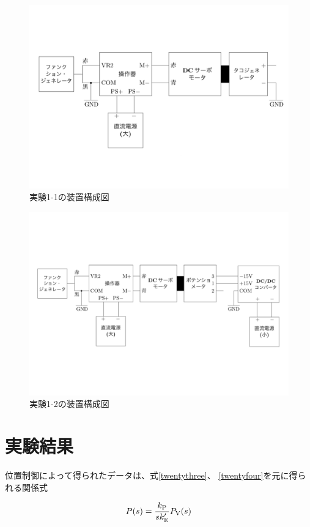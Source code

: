 \documentclass[uplatex, 11pt,a4j, titlepage]{jsarticle}
\begin{document}
\begin{figure}[h]
    \centering
    \includegraphics[width=12cm]{fig1.pdf}
    \caption{実験1-1の装置構成図}
    \label{fig1}
\end{figure}

\begin{figure}[h]
    \centering
    \includegraphics[width=12cm]{fig2.pdf}
    \caption{実験1-2の装置構成図}
    \label{fig2}
\end{figure}

\newpage

\section{実験結果}

位置制御によって得られたデータは、式\ref{twentythree}、
\ref{twentyfour}を元に得られる関係式

\begin{equation}\label{twentyfive}
    P(s)=\frac{k_{\rm P}}{sk'_{\rm E}}P_{\rm V}(s)
\end{equation}
\end{document}
